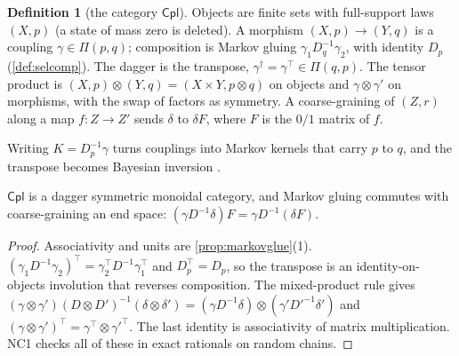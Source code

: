 \documentclass[11pt]{article}
\theoremstyle{definition}\newtheorem{definition}[theorem]{Definition}\newtheorem{remark}[theorem]{Remark}\newtheorem{example}[theorem]{Example}\newtheorem{problem}[theorem]{Open problem}\crefname{problem}{Problem}{Problems}
\begin{document}
\begin{definition}[the category $\mathsf{Cpl}$]\label{def:cpl}
Objects are finite sets with full-support laws $(X,p)$ (a state of mass zero is deleted). A morphism $(X,p)\to(Y,q)$ is a coupling $\gamma\in\Pi(p,q)$; composition is Markov gluing
$\gamma_1D_q^{-1}\gamma_2$, with identity $D_p$ (\cref{def:selcomp}). The dagger is the transpose, $\gamma^\dagger=\gamma^{\!\top}\in\Pi(q,p)$. The tensor product is $(X,p)\otimes(Y,q)=(X\times Y,p\otimes q)$ on objects and
$\gamma\otimes\gamma'$ on morphisms, with the swap of factors as symmetry. A coarse-graining of $(Z,r)$ along a map $f:Z\to Z'$ sends $\delta$ to $\delta F$, where $F$ is the $0/1$ matrix of $f$.
\end{definition}

Writing $K=D_p^{-1}\gamma$ turns couplings into Markov kernels that carry $p$ to $q$, and the transpose becomes Bayesian inversion \cite{Fritz2020,ChoJacobs2019}.

\begin{proposition}\label{prop:cplcat}
$\mathsf{Cpl}$ is a dagger symmetric monoidal category, and Markov gluing commutes with coarse-graining an end space: $(\gamma D^{-1}\delta)F=\gamma D^{-1}(\delta F)$.
\end{proposition}

\begin{proof}
Associativity and units are \cref{prop:markovglue}(1). $(\gamma_1D^{-1}\gamma_2)^{\!\top}=\gamma_2^{\!\top}D^{-1}\gamma_1^{\!\top}$ and $D_p^{\!\top}=D_p$, so the transpose is an identity-on-objects involution that reverses composition. The mixed-product rule gives
$(\gamma\otimes\gamma')(D\otimes D')^{-1}(\delta\otimes\delta')=(\gamma D^{-1}\delta)\otimes(\gamma'D'^{-1}\delta')$ and $(\gamma\otimes\gamma')^{\!\top}=\gamma^{\!\top}\otimes\gamma'^{\!\top}$. The last identity is associativity of matrix
multiplication. NC1 checks all of these in exact rationals on random chains.
\end{proof}
\end{document}
